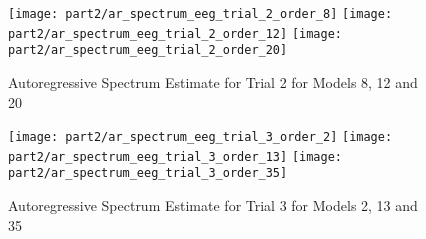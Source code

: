 \begin{figure}[H]
\centering{}
\texttt{[image: part2/ar\_spectrum\_eeg\_trial\_2\_order\_8]}
\texttt{[image: part2/ar\_spectrum\_eeg\_trial\_2\_order\_12]}
\texttt{[image: part2/ar\_spectrum\_eeg\_trial\_2\_order\_20]}
\caption{Autoregressive Spectrum Estimate for Trial 2 for Models 8, 12 and 20}
\end{figure}

\begin{figure}[H]
\centering{}
\texttt{[image: part2/ar\_spectrum\_eeg\_trial\_3\_order\_2]}
\texttt{[image: part2/ar\_spectrum\_eeg\_trial\_3\_order\_13]}
\texttt{[image: part2/ar\_spectrum\_eeg\_trial\_3\_order\_35]}
\caption{Autoregressive Spectrum Estimate for Trial 3 for Models 2, 13 and 35}
\end{figure}

